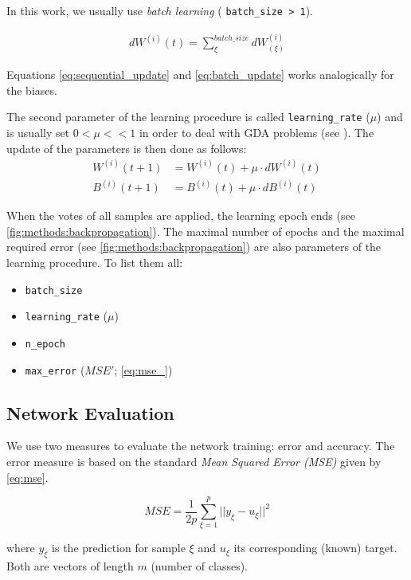 \begin{enumerate}
In this work, we usually use \textit{batch learning} ( \texttt{batch\_size > 1}).

\begin{align} \label{eq:batch_update}
dW^{(i)}(t) = \displaystyle{\sum_{\xi}^{batch\_size} dW^{(i)}_{(\xi)}}
\end{align}

Equations \ref{eq:sequential_update} and \ref{eq:batch_update} works analogically for the biases.

The second parameter of the learning procedure is called \texttt{learning\_rate} ($ \mu $) and is usually set $ 0 < \mu << 1 $ in order to deal with GDA problems (see \citep{online:nnanddl}). The update of the parameters is then done as follows:
\begin{align} \label{eq:params_update}
W^{(i)} (t+1) &= W^{(i)} (t) + \mu \cdot dW^{(i)} (t) \\ 
B^{(i)} (t+1) &= B^{(i)} (t) + \mu \cdot dB^{(i)} (t)
\end{align}
\end{enumerate}

When the votes of all samples are applied, the learning epoch ends (see \cref{fig:methods:backpropagation}). The maximal number of epochs and the maximal required error (see \cref{fig:methods:backpropagation}) are also parameters of the learning procedure. To list them all:

\begin{itemize}
\item \texttt{batch\_size}
\item \texttt{learning\_rate} ($ \mu $)
\item \texttt{n\_epoch}
\item \texttt{max\_error} ($ MSE' $; \cref{eq:mse_})
\end{itemize}

\subsection*{Network Evaluation}
We use two measures to evaluate the network training: error and accuracy.
The error measure is based on the standard \textit{Mean Squared Error (MSE)} given by \cref{eq:mse}.

\begin{equation} \label{eq:mse}
MSE = \frac{1}{2 p} \displaystyle{\sum^{p}_{\xi=1} ||y_{\xi} - u_{\xi}||^2}
\end{equation}

where $ y_{\xi} $ is the prediction for sample $ \xi $ and $ u_{\xi} $ its corresponding (known) target. Both are vectors of length $ m $ (number of classes).

